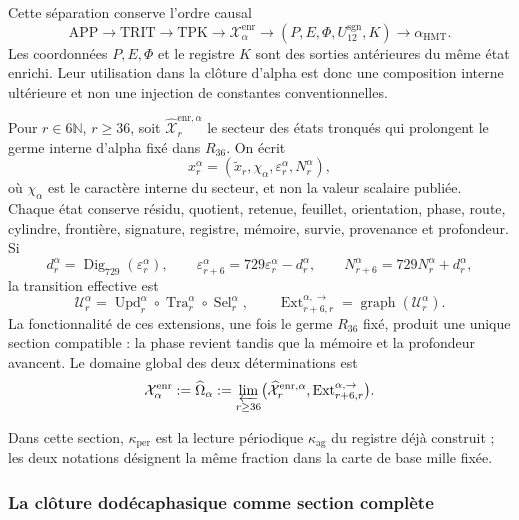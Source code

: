 Cette séparation conserve l'ordre causal
\[
 \mathrm{APP}\longrightarrow\mathrm{TRIT}\longrightarrow\mathrm{TPK}
 \longrightarrow\mathcal X_{\alpha}^{\mathrm{enr}}
 \longrightarrow (P,E,\Phi,U_{12}^{\mathrm{sgn}},K)
 \longrightarrow\alpha_{\mathrm{HMT}}.
\]
Les coordonnées \(P,E,\Phi\) et le registre \(K\) sont des sorties antérieures du
même état enrichi. Leur utilisation dans la clôture d'alpha est donc une
composition interne ultérieure et non une injection de constantes
conventionnelles.

Pour \(r\in6\mathbb N\), \(r\ge36\), soit
\(\widehat{\mathcal X}^{\mathrm{enr},\alpha}_r\) le secteur des états
tronqués qui prolongent le germe interne d'alpha fixé dans \(R_{36}\). On
écrit
\[
 x_r^\alpha=(\widetilde x_r,\chi_\alpha,
              \varepsilon_r^\alpha,N_r^\alpha),
\]
où \(\chi_\alpha\) est le caractère interne du secteur, et non la valeur scalaire
publiée. Chaque état conserve résidu, quotient, retenue, feuillet, orientation,
phase, route, cylindre, frontière, signature, registre, mémoire, survie,
provenance et profondeur. Si
\[
 d_r^\alpha=\operatorname{Dig}_{729}(\varepsilon_r^\alpha),\qquad
 \varepsilon_{r+6}^\alpha=729\varepsilon_r^\alpha-d_r^\alpha,
 \qquad N_{r+6}^\alpha=729N_r^\alpha+d_r^\alpha,
\]
la transition effective est
\[
 \mathcal U_r^\alpha=
 \operatorname{Upd}_r^\alpha\circ
 \operatorname{Tra}_r^\alpha\circ
 \operatorname{Sel}_r^\alpha,
 \qquad
 \operatorname{Ext}^{\alpha,\to}_{r+6,r}
 =\operatorname{graph}(\mathcal U_r^\alpha).
\]
La fonctionnalité de ces extensions, une fois le germe \(R_{36}\) fixé,
produit une unique section compatible : la phase revient tandis que la mémoire et
la profondeur avancent. Le domaine global des deux déterminations est
\begin{equation}
 \mathcal X_\alpha^{\mathrm{enr}}:=\widehat\Omega_\alpha
 :=\varprojlim_{r\ge36}
 \bigl(\widehat{\mathcal X}^{\mathrm{enr},\alpha}_r,
       \operatorname{Ext}^{\alpha,\to}_{r+6,r}\bigr).
 \label{x_reciprocidad:eq:alpha-dominio-enriquecido-completo}
\end{equation}

Dans cette section, \(\kappa_{\mathrm{per}}\) est la lecture périodique \(\kappa_{\mathrm{ag}}\) du registre déjà construit ; les deux notations désignent la même fraction dans la carte de base mille fixée.

\subsubsection{La clôture dodécaphasique comme section complète}


